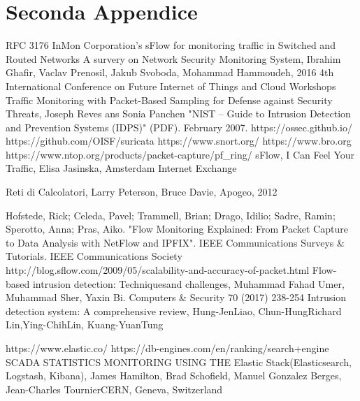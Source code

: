 \documentclass[12pt,a4paper,openright,twoside]{report}
\begin{document}
\chapter{Seconda Appendice}             %
\begin{thebibliography}{90}             %
\rhead[\fancyplain{}{\bfseries \leftmark}]{\fancyplain{}{\bfseries
\thepage}}
 RFC 3176 InMon Corporation's sFlow for monitoring traffic in Switched
and Routed Networks
 A survery on Network Security Monitoring System,
Ibrahim Ghafir, Vaclav Prenosil, Jakub Svoboda, Mohammad Hammoudeh,
 2016 4th International Conference on Future Internet of Things and Cloud Workshops
 Traffic Monitoring with Packet-Based Sampling for Defense against Security Threats, Joseph Reves ans Sonia Panchen
 "NIST – Guide to Intrusion Detection and Prevention Systems (IDPS)" (PDF). February 2007.
 https://ossec.github.io/
 https://github.com/OISF/suricata
 https://www.snort.org/
 https://www.bro.org
 https://www.ntop.org/products/packet-capture/pf\_ring/
 sFlow, I Can Feel Your Traffic, Elisa Jasinska, Amsterdam Internet Exchange


 Reti di Calcolatori, Larry Peterson, Bruce Davie, Apogeo, 2012

 Hofstede, Rick; Celeda, Pavel; Trammell, Brian; Drago, Idilio; Sadre, Ramin; Sperotto, Anna; Pras, Aiko. "Flow Monitoring Explained: From Packet Capture to Data Analysis with NetFlow and IPFIX". IEEE Communications Surveys & Tutorials. IEEE Communications Society
 http://blog.sflow.com/2009/05/scalability-and-accuracy-of-packet.html
 Flow-based intrusion detection: Techniquesand challenges, Muhammad Fahad Umer, Muhammad Sher, Yaxin Bi. Computers \& Security 70 (2017) 238-254
 Intrusion detection system: A comprehensive review, Hung-JenLiao, Chun-HungRichard Lin,Ying-ChihLin, Kuang-YuanTung

 https://www.elastic.co/
 https://db-engines.com/en/ranking/search+engine
 SCADA STATISTICS MONITORING USING THE Elastic Stack(Elasticsearch, Logstash, Kibana), James Hamilton, Brad Schofield, Manuel Gonzalez Berges, Jean-Charles TournierCERN, Geneva, Switzerland


\end{thebibliography}
\end{document}
